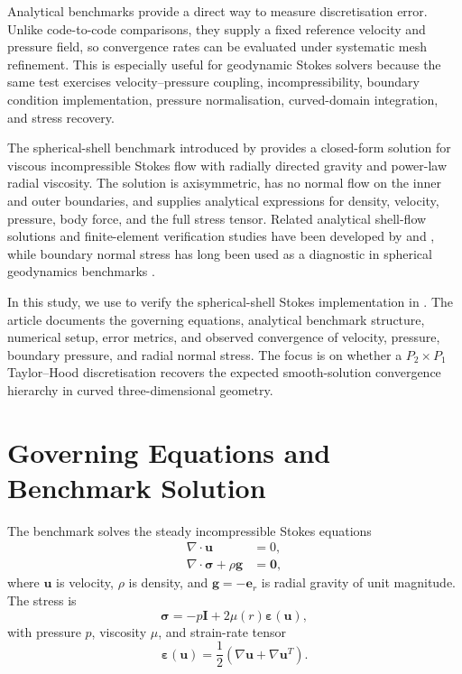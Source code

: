 \documentclass[gmd, manuscript]{copernicus}
\begin{document}
Analytical benchmarks provide a direct way to measure discretisation error.
Unlike code-to-code comparisons, they supply a fixed reference velocity and
pressure field, so convergence rates can be evaluated under systematic mesh
refinement. This is especially useful for geodynamic Stokes solvers because the
same test exercises velocity--pressure coupling, incompressibility, boundary
condition implementation, pressure normalisation, curved-domain integration,
and stress recovery.

The spherical-shell benchmark introduced by  provides
a closed-form solution for viscous incompressible Stokes flow with radially
directed gravity and power-law radial viscosity. The solution is axisymmetric,
has no normal flow on the inner and outer boundaries, and supplies analytical
expressions for density, velocity, pressure, body force, and the full stress
tensor. Related analytical shell-flow solutions and finite-element verification
studies have been developed by \citet{kramer2021} and \citet{davies2022}, while
boundary normal stress has long been used as a diagnostic in spherical
geodynamics benchmarks \citep{zhong1993,zhong2008,liu2019}.

In this study, we use  to verify the spherical-shell
Stokes implementation in . The article documents the
governing equations, analytical benchmark structure, numerical setup, error
metrics, and observed convergence of velocity, pressure, boundary pressure, and
radial normal stress. The focus is on whether a \(P_2\times P_1\)
Taylor--Hood discretisation recovers the expected smooth-solution convergence
hierarchy in curved three-dimensional geometry.

\section{Governing Equations and Benchmark Solution}

The benchmark solves the steady incompressible Stokes equations
\begin{subequations}
\begin{align}
  \nabla \cdot \mathbf{u} &= 0, \\
  \nabla \cdot \boldsymbol{\sigma} + \rho\mathbf{g} &= \mathbf{0},
\end{align}
\end{subequations}
where \(\mathbf{u}\) is velocity, \(\rho\) is density, and
\(\mathbf{g}=-\mathbf{e}_r\) is radial gravity of unit magnitude. The stress is
\begin{equation}
  \boldsymbol{\sigma}
  =
  -p\mathbf{I}
  +
  2\mu(r)\boldsymbol{\varepsilon}(\mathbf{u}),
\end{equation}
with pressure \(p\), viscosity \(\mu\), and strain-rate tensor
\begin{equation}
  \boldsymbol{\varepsilon}(\mathbf{u})
  =
  \frac{1}{2}\left(\nabla\mathbf{u}+\nabla\mathbf{u}^{T}\right).
\end{equation}
\end{document}
